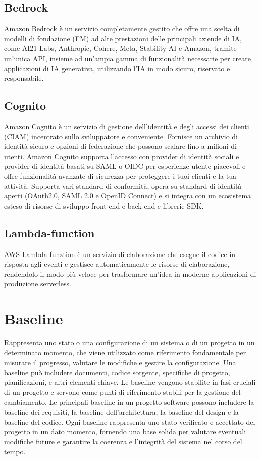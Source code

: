 \documentclass{article}
\begin{document}
\subsection{Bedrock}
Amazon Bedrock è un servizio completamente gestito che offre una scelta di modelli di fondazione (FM) ad alte prestazioni delle principali aziende di IA, come AI21 Labs, Anthropic, Cohere, Meta, Stability AI e Amazon, tramite un'unica API, insieme ad un'ampia gamma di funzionalità necessarie per creare applicazioni di IA generativa, utilizzando l'IA in modo sicuro, riservato e responsabile.
\subsection{Cognito}
Amazon Cognito è un servizio di gestione dell'identità e degli accessi dei clienti (CIAM) incentrato sullo sviluppatore e conveniente. Fornisce un archivio di identità sicuro e opzioni di federazione che possono scalare fino a milioni di utenti. Amazon Cognito supporta l'accesso con provider di identità sociali e provider di identità basati su SAML o OIDC per esperienze utente piacevoli e offre funzionalità avanzate di sicurezza per proteggere i tuoi clienti e la tua attività. Supporta vari standard di conformità, opera su standard di identità aperti (OAuth2.0, SAML 2.0 e OpenID Connect) e si integra con un ecosistema esteso di risorse di sviluppo front-end e back-end e librerie SDK.
\subsection{Lambda-function}
AWS Lambda-funztion è un servizio di elaborazione che esegue il codice in risposta agli eventi e gestisce automaticamente le risorse di elaborazione, rendendolo il modo più veloce per trasformare un'idea in moderne applicazioni di produzione serverless. 

\section{Baseline}
Rappresenta uno stato o una configurazione di un sistema o di un progetto in un determinato momento, che viene utilizzato come riferimento fondamentale per misurare il progresso, valutare le modifiche e gestire la configurazione. Una baseline può includere documenti, codice sorgente, specifiche di progetto, pianificazioni, e altri elementi chiave.
Le baseline vengono stabilite in fasi cruciali di un progetto e servono come punti di riferimento stabili per la gestione del cambiamento. Le principali baseline in un progetto software possono includere la baseline dei requisiti, la baseline dell'architettura, la baseline del design e la baseline del codice. Ogni baseline rappresenta uno stato verificato e accettato del progetto in un dato momento, fornendo una base solida per valutare eventuali modifiche future e garantire la coerenza e l'integrità del sistema nel corso del tempo.
\end{document}
